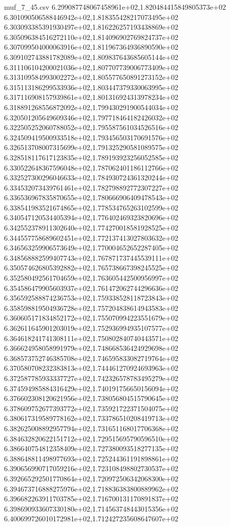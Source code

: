 \begin{filecontents*}{muf_7_45.csv}
6.299087748067458961e+02,1.820484415849805373e+02
6.301090506588446942e+02,1.818355428217073495e+02
6.303093385391930497e+02,1.816226257193438869e+02
6.305096384516272110e+02,1.814096902769824737e+02
6.307099504000063916e+02,1.811967364936890590e+02
6.309102743881782089e+02,1.809837643685605144e+02
6.311106104200021036e+02,1.807707739006773409e+02
6.313109584993002272e+02,1.805577650891273152e+02
6.315113186299533936e+02,1.803447379330063995e+02
6.317116908157939861e+02,1.801316924313978234e+02
6.318891268556872092e+02,1.799430291900544034e+02
6.320501205649609346e+02,1.797718464182426032e+02
6.322505252060788052e+02,1.795587561034526516e+02
6.324509419500933518e+02,1.793456503170691576e+02
6.326513708007315699e+02,1.791325290581089575e+02
6.328518117617123835e+02,1.789193923256052585e+02
6.330522648367596048e+02,1.787062401186112766e+02
6.332527300296046633e+02,1.784930724361320244e+02
6.334532073439761461e+02,1.782798892772307227e+02
6.336536967835870655e+02,1.780666906409478543e+02
6.338541983521674865e+02,1.778534765263102599e+02
6.340547120534405394e+02,1.776402469323820696e+02
6.342552378911302640e+02,1.774270018581928525e+02
6.344557758689602451e+02,1.772137413027803632e+02
6.346563259906573649e+02,1.770004652652287405e+02
6.348568882599407743e+02,1.767871737445539111e+02
6.350574626805392882e+02,1.765738667398245525e+02
6.352580492561704659e+02,1.763605442500956997e+02
6.354586479905603937e+02,1.761472062744296636e+02
6.356592588874236753e+02,1.759338528118723843e+02
6.358598819504936728e+02,1.757204838614943583e+02
6.360605171834852172e+02,1.755070994223551679e+02
6.362611645901203019e+02,1.752936994935107577e+02
6.364618241741308111e+02,1.750802840740443571e+02
6.366624958058991979e+02,1.748668536424929698e+02
6.368573752746385708e+02,1.746595833082719764e+02
6.370580708232383813e+02,1.744461270924693963e+02
6.372587785933337727e+02,1.742326578783495279e+02
6.374594985884316429e+02,1.740191756650156094e+02
6.376602308120621956e+02,1.738056804515790645e+02
6.378609752677393772e+02,1.735921722371504075e+02
6.380617319589778162e+02,1.733786510208419713e+02
6.382625008892957794e+02,1.731651168017706368e+02
6.384632820622151712e+02,1.729515695790596510e+02
6.386640754812358409e+02,1.727380093518277135e+02
6.388648811498977693e+02,1.725244361191898861e+02
6.390656990717059216e+02,1.723108498802730537e+02
6.392665292501770864e+02,1.720972506342068300e+02
6.394673716888275976e+02,1.718836383800889962e+02
6.396682263911703785e+02,1.716700131170891837e+02
6.398690933607330180e+02,1.714563748443015356e+02
6.400699726010172981e+02,1.712427235608647607e+02

\end{filecontents*}
